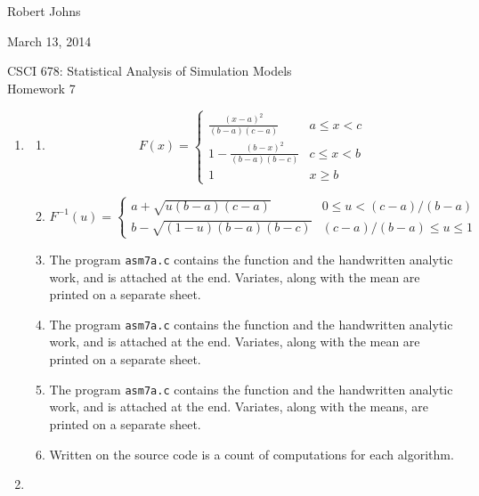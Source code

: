 \documentclass[11pt]{article} %
\newcommand{\inv}{^{-1}}
\begin{document}
\hfill Robert Johns

\hfill March 13, 2014

\begin{center} {\Large CSCI 678: Statistical Analysis of Simulation Models}\\{\large Homework 7}\end{center}

\begin{enumerate}

\item

\begin{enumerate}

\item $$F(x) = \left\{\begin{array}{ll}\frac{(x - a)^2}{(b-a)(c-a)} & a \le x < c \\ 1-\frac{(b-x)^2}{(b-a)(b-c)} & c \le x < b\\ 1 & x \ge b \end{array}\right.$$

\item $$F\inv(u) = \left\{\begin{array}{ll} a + \sqrt{u(b-a)(c - a)} & 0 \le u < (c-a)/(b-a) \\ b - \sqrt{(1 - u)(b-a)(b - c)} & (c-a)/(b-a) \le u \le 1\end{array}\right.$$

\item The program \texttt{asm7a.c} contains the function and the handwritten analytic work, and is attached at the end.  Variates, along with the mean are printed on a separate sheet.

\item The program \texttt{asm7a.c} contains the function and the handwritten analytic work, and is attached at the end.  Variates, along with the mean are printed on a separate sheet.

\item The program \texttt{asm7a.c} contains the function and the handwritten analytic work, and is attached at the end.  Variates, along with the means, are printed on a separate sheet.

\item Written on the source code is a count of computations for each algorithm.

\end{enumerate}

\item


\end{enumerate}
\end{document}
